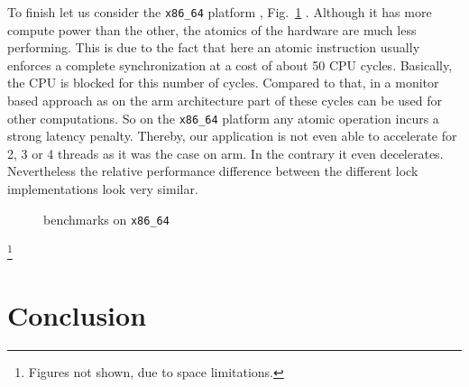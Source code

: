 To finish let us consider the \texttt{x86\_64} platform%
\iflong%
, Fig.~\ref{fig:x86_64}%
\fi%
. Although it
has more compute power than the other, the atomics of the hardware
are much less performing. This is due to the fact that here an
atomic instruction usually enforces a complete
synchronization at a cost of about 50 CPU cycles. Basically, the CPU
is blocked for this number of cycles. Compared to that, in a monitor based approach
as on the arm architecture part of these cycles can be used for other computations.
So on the \texttt{x86\_64} platform any atomic operation incurs a strong latency
penalty. Thereby, our application is not even able to accelerate for
2, 3 or 4 threads as it was the case on arm. In the contrary it
even decelerates.
Nevertheless the relative performance difference between the
different lock implementations look very similar.%
\iflong
\begin{figure}[t]
  \caption{benchmarks on \texttt{x86\_64}}
  \label{fig:x86_64}
\end{figure}
\else
\footnote{Figures not shown, due to space limitations.}
\fi

\section{Conclusion}
\label{sec-5}

